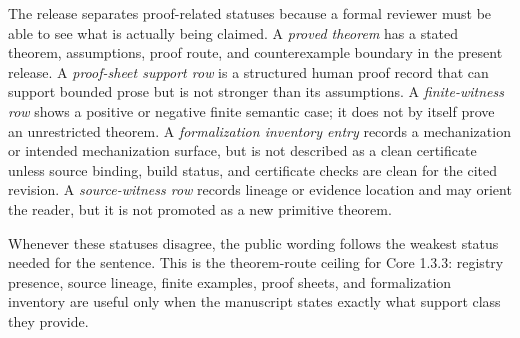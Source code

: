 The release separates proof-related statuses because a formal reviewer must be
able to see what is actually being claimed. A \emph{proved theorem} has a
stated theorem, assumptions, proof route, and counterexample boundary in the
present release. A \emph{proof-sheet support row} is a structured human proof
record that can support bounded prose but is not stronger than its assumptions.
A \emph{finite-witness row} shows a positive or negative finite semantic case;
it does not by itself prove an unrestricted theorem. A \emph{formalization
inventory entry} records a mechanization or intended mechanization surface, but
is not described as a clean certificate unless source binding, build status,
and certificate checks are clean for the cited revision. A \emph{source-witness
row} records lineage or evidence location and may orient the reader, but it is
not promoted as a new primitive theorem.

Whenever these statuses disagree, the public wording follows the weakest
status needed for the sentence. This is the theorem-route ceiling for Core
1.3.3: registry presence, source lineage, finite examples, proof sheets, and
formalization inventory are useful only when the manuscript states exactly what
support class they provide.

